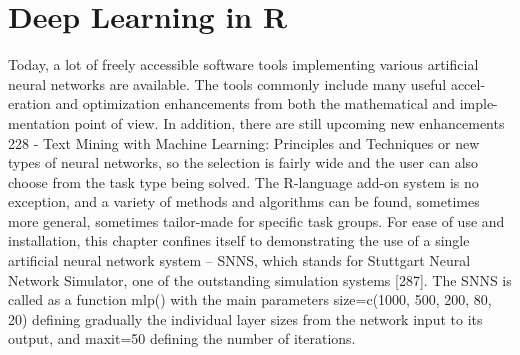 \documentclass[11pt,openany,executivepaper]{book}
\begin{document}
\section{Deep Learning in R}

Today, a lot of freely accessible software tools implementing various artificial
neural networks are available. The tools commonly include many useful accel-eration and optimization enhancements from both the mathematical and imple-mentation point of view. In addition, there are still upcoming new enhancements
228 - Text Mining with Machine Learning: Principles and Techniques
or new types of neural networks, so the selection is fairly wide and the user can
also choose from the task type being solved.
The R-language add-on system is no exception, and a variety of methods and
algorithms can be found, sometimes more general, sometimes tailor-made for
specific task groups. For ease of use and installation, this chapter confines itself
to demonstrating the use of a single artificial neural network system – SNNS,
which stands for Stuttgart Neural Network Simulator, one of the outstanding
simulation systems [287].
The SNNS is called as a function mlp() with the main parameters
size=c(1000, 500, 200, 80, 20) defining gradually the individual layer
sizes from the network input to its output, and maxit=50 defining the number of
iterations.
\end{document}

